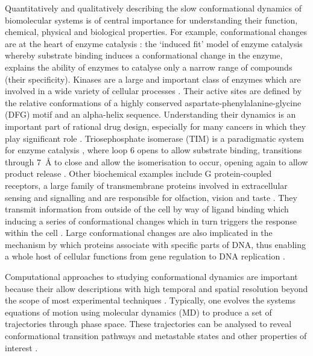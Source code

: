 Quantitatively and qualitatively describing the slow conformational dynamics of biomolecular systems is of central importance for understanding their function, chemical, physical and biological properties. For example, conformational changes are at the heart of enzyme catalysis \cite{hammesMultipleConformationalChanges2002b,hammes-schifferRelatingProteinMotion2006, klinmanHydrogenTunnelingLinks2013}: the `induced fit' model of enzyme catalysis \cite{koshlandCorrelationStructureFunction1963} whereby substrate binding induces a conformational change in the enzyme,  explains the ability of enzymes to catalyse only a narrow range of compounds (their specificity). Kinases are a large and important class of enzymes which are involved in a wide variety of cellular processes \cite{edelmanProteinSerineThreonine1987a}. Their active sites are defined by the relative conformations of a highly conserved aspartate-phenylalanine-glycine (DFG) motif and an alpha-helix \cite{ungRedefiningProteinKinase2018a} sequence. Understanding their dynamics is an important part of rational drug design, especially for many cancers in which they play significant role \cite{shuklaActivationPathwaySrc2014}.  Triosephosphate isomerase (TIM) is a paradigmatic system for enzyme catalysis \cite{richardParadigmEnzymeCatalyzedProton2012a}, where loop 6 opens to  allow substrate binding, transitions through \SI{7}{\angstrom} to close and allow the isomerisation to occur, opening again to allow product release \cite{LoopMotionTriosephosphate}. Other biochemical examples include G protein-coupled receptors, a large family of transmembrane proteins involved in extracellular sensing and signalling and are responsible for olfaction, vision and taste \cite{rosenbaumStructureFunctionGproteincoupled2009}.  They transmit information from outside of the cell by way of ligand binding which inducing a series of conformational changes which in turn triggers the response within the cell \cite{bockenhauerConformationalDynamicsSingle2011a}. Large conformational changes are also implicated in the mechanism by which proteins associate with specific parts of DNA, thus enabling a whole host of cellular functions from gene regulation to DNA replication \cite{vandervaartCoupledBindingBending2015}.  

Computational approaches to studying conformational dynamics are important because their allow descriptions with high temporal and spatial resolution beyond the scope of most experimental techniques \cite{hugginsBiomolecularSimulationsDynamics2019}. Typically, one evolves the systems equations of motion using molecular dynamics (MD) to produce a set of trajectories through phase space. These trajectories can be analysed to reveal conformational transition pathways and metastable states and other properties of interest \cite{rohrdanzDiscoveringMountainPasses2013a}. 

